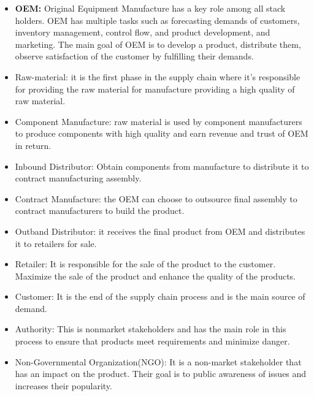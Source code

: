 \begin{itemize}
	\item \textbf{OEM: } Original Equipment Manufacture has a key role among all stack holders. OEM has multiple tasks such as forecasting demands of customers, inventory management, control flow, and product development, and marketing. The main goal of OEM is to develop a product, distribute them, observe satisfaction of the customer by fulfilling their demands.\\
	\item Raw-material: it is the first phase in the supply chain where it's responsible for providing the raw material for manufacture providing a high quality of raw material.
	\item Component Manufacture: raw material is used by component manufacturers to produce components with high quality and earn revenue and trust of OEM in return.
	\item Inbound Distributor: Obtain components from manufacture to distribute it to contract manufacturing assembly.
	\item Contract Manufacture: the OEM can choose to outsource final assembly to contract manufacturers to build the product.\\ 
	\item Outband Distributor: it receives the final product from OEM and distributes it to retailers for sale.
	\item Retailer: It is responsible for the sale of the product to the customer. Maximize the sale of the product and enhance the quality of the products.
	\item Customer: It is the end of the supply chain process and is the main source of demand.
	\item Authority: This is nonmarket stakeholders and has the main role in this process to ensure that products meet requirements and minimize danger.
	\item Non-Governmental Organization(NGO): It is a non-market stakeholder that has an impact on the product. Their goal is to public awareness of issues and increases their popularity\cite{Angwei}.  
	
\end{itemize}
